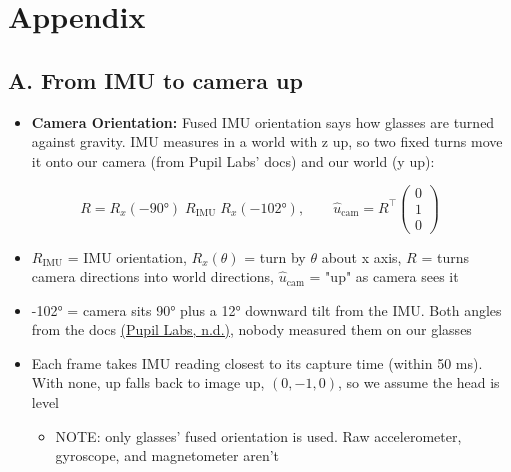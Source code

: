 \documentclass[a4paper]{article}
\begin{document}
\section{Appendix} \label{appendix}

\subsection{A. From IMU to camera up} \label{a-from-imu-to-camera-up}
\begin{itemize}
	\item \textbf{Camera Orientation:} Fused IMU orientation says how glasses are turned against gravity. IMU measures in a world with z up, so two fixed turns move it onto our camera (from Pupil Labs' docs) and our world (y up):
\end{itemize}

  $$R = R_x(-90°)\; R_{\text{IMU}}\; R_x(-102°), \qquad \hat u_{\text{cam}} = R^\top \begin{pmatrix} 0 \\ 1 \\ 0 \end{pmatrix}$$

\begin{itemize}  
	\item $R_{\text{IMU}}$ = IMU orientation, $R_x(\theta)$ = turn by $\theta$ about x axis, $R$ = turns camera directions into world directions, $\hat u_{\text{cam}}$ = "up" as camera sees it  
	\item -102° = camera sits 90° plus a 12° downward tilt from the IMU. Both angles from the docs \hyperref[references]{(Pupil Labs, n.d.)}, nobody measured them on our glasses  
	\item Each frame takes IMU reading closest to its capture time (within 50 ms). With none, up falls back to image up, $(0, -1, 0)$, so we assume the head is level
	\begin{itemize}    
		\item NOTE: only glasses' fused orientation is used. Raw accelerometer, gyroscope, and magnetometer aren't
	\end{itemize}
\end{itemize}
\end{document}
